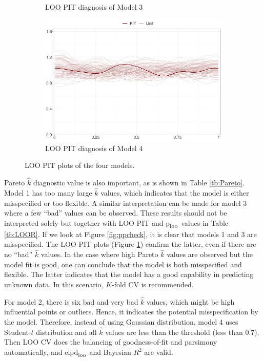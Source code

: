 \documentclass[a4paper]{article}   	%
\newcommand{\elpd}{elpd\textsubscript{loo}}
\newcommand{\ploo}{p\textsubscript{loo}}
\begin{document}
\begin{figure}[!htp]
\begin{subfigure}[t]{0.45\textwidth}
			\caption{LOO PIT diagnosis of Model 3}
		\end{subfigure}
		\begin{subfigure}[t]{0.45\textwidth}
			\includegraphics[width=\linewidth]{Images/pit_STRand}
			\caption{LOO PIT diagnosis of Model 4}
		\end{subfigure}
		\caption{LOO PIT plots of the four models. }\label{fig:pitloo}
	\end{figure}
	
	
	Pareto $\hat{k}$ diagnostic value is also important, as is shown in Table \ref{tb:Pareto}. Model 1 has too many large $\hat{k}$ values, which indicates that the model is either misspecified or too flexible. A similar interpretation can be made for model 3 where a few ``bad'' values can be observed. These results should not be interpreted solely but together with LOO PIT and \ploo\ values in Table \ref{tb:LOOR}. If we look at Figure \ref{fig:ppcheck}, it is clear that models 1 and 3 are misspecified. The LOO PIT plots (Figure \ref{fig:pitloo}) confirm the latter, even if there are no ``bad'' $\hat{k}$ values. In the case where high Pareto $\hat{k}$ values are observed but the model fit is good, one can conclude that the model is both misspecified and flexible. The latter indicates that the model has a good capability in predicting unknown data. In this scenario, $K$-fold CV is recommended. 
	
	For model 2, there is six bad and very bad $\hat{k}$ values, which might be high influential points or outliers. Hence, it indicates the potential misspecification by the model. Therefore, instead of using Gaussian distribution, model 4 uses Student-$t$ distribution and all $\hat{k}$ values are less than the threshold  (less than 0.7). Then LOO CV does the balancing of goodness-of-fit and parsimony automatically, and \elpd\ and Bayesian $R^2$ are valid. 
	
\end{document}
